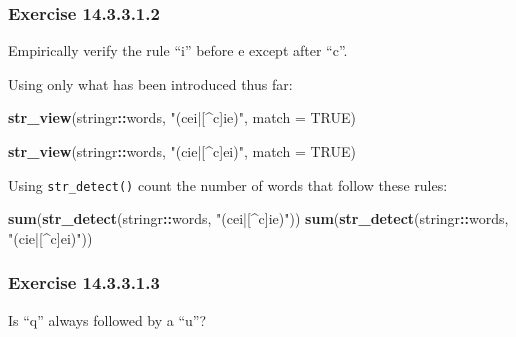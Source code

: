 \documentclass[]{book}
\newenvironment{Shaded}{\begin{snugshade}}{\end{snugshade}}
\newcommand{\DataTypeTok}[1]{\textcolor[rgb]{0.13,0.29,0.53}{#1}}
\newcommand{\KeywordTok}[1]{\textcolor[rgb]{0.13,0.29,0.53}{\textbf{#1}}}
\newcommand{\NormalTok}[1]{#1}
\newcommand{\OperatorTok}[1]{\textcolor[rgb]{0.81,0.36,0.00}{\textbf{#1}}}
\newcommand{\OtherTok}[1]{\textcolor[rgb]{0.56,0.35,0.01}{#1}}
\newcommand{\StringTok}[1]{\textcolor[rgb]{0.31,0.60,0.02}{#1}}
\theoremstyle{plain}
\theoremstyle{remark}
\begin{document}
\hypertarget{exercise-14.3.3.1.2}{%
\subsubsection*{\texorpdfstring{Exercise {14.3.3.1.2}}{Exercise 14.3.3.1.2}}\label{exercise-14.3.3.1.2}}

Empirically verify the rule ``i'' before e except after ``c''.

Using only what has been introduced thus far:

\begin{Shaded}
\begin{Highlighting}[]
\KeywordTok{str_view}\NormalTok{(stringr}\OperatorTok{::}\NormalTok{words, }\StringTok{"(cei|[^c]ie)"}\NormalTok{, }\DataTypeTok{match =} \OtherTok{TRUE}\NormalTok{)}
\end{Highlighting}
\end{Shaded}

\begin{Shaded}
\begin{Highlighting}[]
\KeywordTok{str_view}\NormalTok{(stringr}\OperatorTok{::}\NormalTok{words, }\StringTok{"(cie|[^c]ei)"}\NormalTok{, }\DataTypeTok{match =} \OtherTok{TRUE}\NormalTok{)}
\end{Highlighting}
\end{Shaded}

Using \texttt{str\_detect()} count the number of words that follow these rules:

\begin{Shaded}
\begin{Highlighting}[]
\KeywordTok{sum}\NormalTok{(}\KeywordTok{str_detect}\NormalTok{(stringr}\OperatorTok{::}\NormalTok{words, }\StringTok{"(cei|[^c]ie)"}\NormalTok{))}
\KeywordTok{sum}\NormalTok{(}\KeywordTok{str_detect}\NormalTok{(stringr}\OperatorTok{::}\NormalTok{words, }\StringTok{"(cie|[^c]ei)"}\NormalTok{))}
\end{Highlighting}
\end{Shaded}

\hypertarget{exercise-14.3.3.1.3}{%
\subsubsection*{\texorpdfstring{Exercise {14.3.3.1.3}}{Exercise 14.3.3.1.3}}\label{exercise-14.3.3.1.3}}

Is ``q'' always followed by a ``u''?
\end{document}
